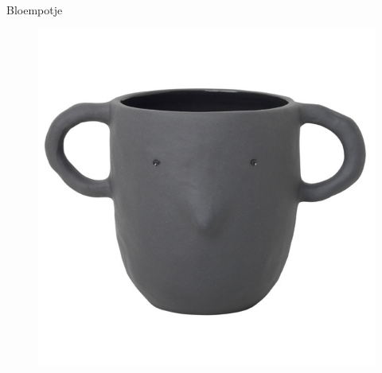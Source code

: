 \documentclass[10pt]{beamer}
\begin{document}
\begin{frame}{Bloempotje}
    \begin{figure}
        \centering
        \includegraphics[scale=0.2]{bloempotje.jpg}
        \caption{}
        \label{fig:my_label}
    \end{figure}
\end{frame}
\end{document}
